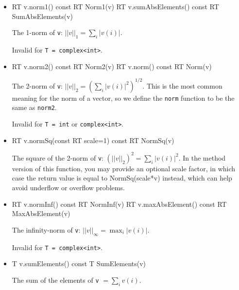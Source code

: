 \documentclass[twoside,letterpaper,11pt]{article}
\renewcommand{\tt}[1]{{\lstinline {#1}}}
\begin{document}
\begin{itemize}

\item
\begin{tmvcode}
RT v.norm1() const
RT Norm1(v)
RT v.sumAbsElements() const
RT SumAbsElements(v)
\end{tmvcode}
The 1-norm of \tt{v}: $||v||_1 = \sum_i |v(i)|$.  

Invalid for \tt{T = complex<int>}.

\item
\begin{tmvcode}
RT v.norm2() const
RT Norm2(v)
RT v.norm() const
RT Norm(v)
\end{tmvcode}
The 2-norm of \tt{v}: $||v||_2 = (\sum_i |v(i)|^2)^{1/2}$.
This is the most common meaning for the norm of a vector, so we
define the \tt{norm} function to be the same as \tt{norm2}.  

Invalid for \tt{T = int} or \tt{complex<int>}.

\item
\begin{tmvcode}
RT v.normSq(const RT scale=1) const
RT NormSq(v)
\end{tmvcode}
The square of the 2-norm of \tt{v}: $(||v||_2)^2 = \sum_i |v(i)|^2$.
In the method version of this function, you may provide an optional scale factor,
in which case the return value is equal to NormSq(scale*v) instead, 
which can help avoid underflow or overflow problems.

\item
\begin{tmvcode}
RT v.normInf() const
RT NormInf(v)
RT v.maxAbsElement() const
RT MaxAbsElement(v)
\end{tmvcode}
The infinity-norm of \tt{v}: $||v||_\infty = \max_i |v(i)|$.  

Invalid for \tt{T = complex<int>}.

\item
\begin{tmvcode}
T v.sumElements() const
T SumElements(v)
\end{tmvcode}
The sum of the elements of \tt{v} $= \sum_i v(i)$.


\end{itemize}
\end{document}
